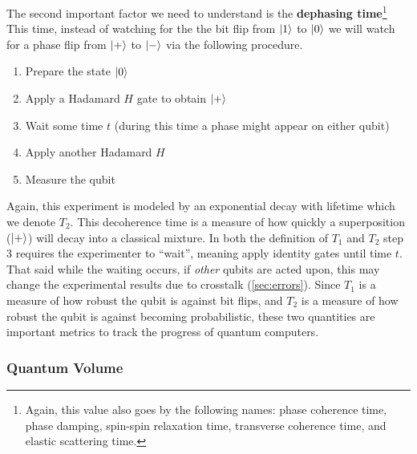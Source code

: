 The second important factor we need to understand is the \textbf{dephasing time}\footnote{Again, this value also goes by the following names: phase coherence time, phase damping, spin-spin relaxation time, transverse coherence time, and elastic scattering time.}
This time, instead of watching for the the bit flip from $\ket{1}$ to $\ket{0}$ we will watch for a phase flip from $\ket{+}$ to $\ket{-}$ via the following procedure.
\begin{enumerate}
    \item Prepare the state $\ket{0}$
    \item Apply a Hadamard $H$ gate to obtain $\ket{+}$
    \item Wait some time $t$ (during this time a phase might appear on either qubit)
    \item Apply another Hadamard $H$
    \item Measure the qubit
\end{enumerate}
Again, this experiment is modeled by an exponential decay with lifetime which we denote $T_2$.
This decoherence time is a measure of how quickly a superposition ($\ket{+}$) will decay into a classical mixture.
In both the definition of $T_1$ and $T_2$ step 3 requires the experimenter to ``wait'', meaning apply identity gates until time $t$.
That said while the waiting occurs, if \emph{other} qubits are acted upon, this may change the experimental results due to crosstalk (\cref{sec:errors}).
Since $T_1$ is a measure of how robust the qubit is against bit flips, and $T_2$ is a measure of how robust the qubit is against becoming probabilistic, these two quantities are important metrics to track the progress of quantum computers.

\subsubsection{Quantum Volume}

